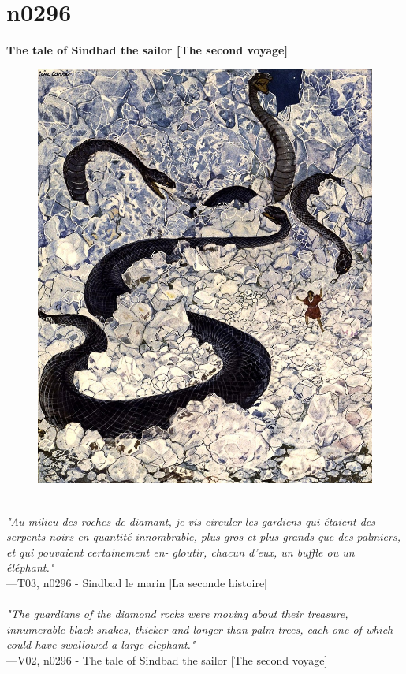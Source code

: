 \documentclass[../Carre_nights.tex]{subfiles}
\begin{document}
\newpage

\section{n0296}
\textbf{\Large{The tale of Sindbad the sailor [The second voyage]}} \\

\begin{figure}[ht]
\centering
\includegraphics[height=\figsize]{illustrations/volume_3/T03, n0296 - Sindbad le marin [La seconde histoire].jpg}
\end{figure}

\textit{\\
"Au milieu des roches de diamant, je vis circuler les gardiens qui étaient des serpents noirs en quantité innombrable, plus gros et plus grands que des palmiers, et qui pouvaient certainement en- gloutir, chacun d’eux, un buffle ou un éléphant."} \\
—T03, n0296 - Sindbad le marin [La seconde histoire] \\~\\
\textit{"The guardians of the diamond rocks were moving about their treasure, innumerable black snakes, thicker and longer than palm-trees, each one of which could have swallowed a large elephant."} \\
—V02, n0296 - The tale of Sindbad the sailor [The second voyage]
\end{document}
